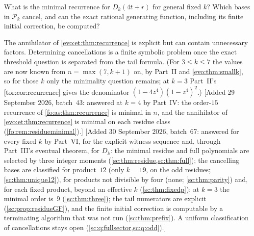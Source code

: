 \documentclass[11pt,a4paper]{article}
\numberwithin{equation}{section}
\theoremstyle{definition}
\theoremstyle{remark}
\begin{document}
\begin{question}\label{evo:q:recurrence}
What is the minimal recurrence for $D_k(4t+r)$ for general fixed $k$? Which
bases in $\mathcal P_k$ cancel, and can the exact rational generating
function, including its finite initial correction, be computed?
\end{question}
The annihilator of \cref{evo:et:thm:recurrence} is explicit but can contain
unnecessary factors. Determining cancellations is a finite symbolic problem
once the exact threshold question is separated from the tail formula. (For
$3\le k\le7$ the values are now known from $n=\max(7,k+1)$ on, by Part~II and
\cref{evo:thm:smallk}, so for those $k$ only the minimality question
remains; at $k=3$ Part~II's \cref{tor:cor:recurrence} gives the denominator
$(1-4z^4)(1-z^4)^2$.) [Added 29 September 2026, batch~43: answered at $k=4$
by Part~IV: the order-$15$ recurrence of \cref{fo:as:thm:recurrence} is minimal
in $n$, and the annihilator of \cref{evo:et:thm:recurrence} is minimal on each
residue class (\cref{fo:rem:residueminimal}).] [Added 30 September 2026, batch~67: answered for every fixed $k$ by Part~VI, for the explicit
witness sequence and, through Part~III's eventual theorem, for $D_k$: the
minimal residue and full polynomials are selected by three integer moments
(\cref{sc:thm:residue,sc:thm:full}); the cancelling bases are classified for
product~$12$ (only $k=19$, on the odd residues; \cref{sc:thm:unique12}), for
products not divisible by four (none; \cref{sc:thm:parity}) and, for each
fixed product, beyond an effective $k$ (\cref{sc:thm:fixedp}); at $k=3$ the
minimal order is~$9$ (\cref{sc:thm:three}); the tail numerators are explicit
(\cref{sc:prop:residueGF}), and the finite initial correction is computable
by a terminating algorithm that was not run (\cref{sc:thm:prefix}). A
uniform classification of cancellations stays open
(\cref{sc:q:fullsector,sc:q:odd}).]
\end{document}
